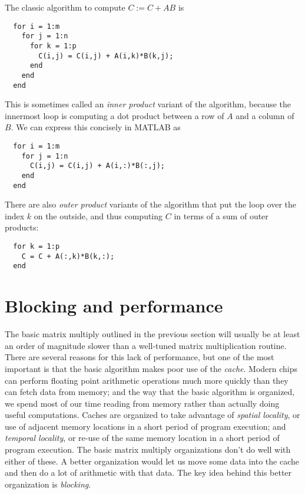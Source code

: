 \documentclass[12pt, leqno]{article}
\begin{document}
The classic algorithm to compute $C := C + AB$ is
\begin{verbatim}
  for i = 1:m
    for j = 1:n
      for k = 1:p
        C(i,j) = C(i,j) + A(i,k)*B(k,j);
      end
    end
  end
\end{verbatim}
This is sometimes called an {\em inner product} variant of
the algorithm, because the innermost loop is computing a dot
product between a row of $A$ and a column of $B$.  We can
express this concisely in MATLAB as
\begin{verbatim}
  for i = 1:m
    for j = 1:n
      C(i,j) = C(i,j) + A(i,:)*B(:,j);
    end
  end
\end{verbatim}
There are also {\em outer product} variants of the algorithm
that put the loop over the index $k$ on the outside, and thus
computing $C$ in terms of a sum of outer products:
\begin{verbatim}
  for k = 1:p
    C = C + A(:,k)*B(k,:);
  end
\end{verbatim}

\section*{Blocking and performance}

The basic matrix multiply outlined in the previous section will
usually be at least an order of magnitude slower than a well-tuned
matrix multiplication routine.  There are several reasons for this
lack of performance, but one of the most important is that the basic
algorithm makes poor use of the {\em cache}.
Modern chips can perform floating point arithmetic operations much
more quickly than they can fetch data from memory; and the way that
the basic algorithm is organized, we spend most of our time reading
from memory rather than actually doing useful computations.
Caches are organized to take advantage of {\em spatial locality},
or use of adjacent memory locations in a short period of program execution;
and {\em temporal locality}, or re-use of the same memory location in a
short period of program execution.  The basic matrix multiply organizations
don't do well with either of these.
A better organization would let us move some data into the cache
and then do a lot of arithmetic with that data.  The key idea behind
this better organization is {\em blocking}.
\end{document}
